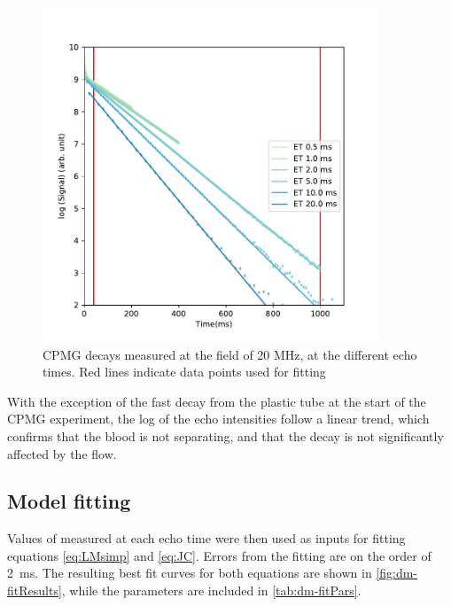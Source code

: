 \begin{figure}[h]
\centering
\includegraphics[width=10cm]{figures/diffmodels/20MHzT2fit.pdf}

\caption{CPMG decays measured at the field of 20 MHz, at the different echo times. Red lines indicate data points used for fitting}
\label{fig:dm-CPMGdecay}
\end{figure}

With the exception of the fast decay from the plastic tube at the start of the CPMG experiment, the log of the echo intensities follow a linear trend, which confirms that the blood is not separating, and that the decay is not significantly affected by the flow.

\subsection{Model fitting}

Values of \Ttwo measured at each echo time were then used as inputs for fitting equations \ref{eq:LMsimp} and \ref{eq:JC}.
Errors from the \Ttwo fitting are on the order of \SI{2}{ms}.
The resulting best fit curves for both equations are shown in \autoref{fig:dm-fitResults}, while the parameters are included in \autoref{tab:dm-fitPars}.

